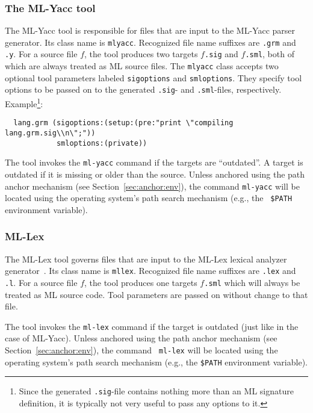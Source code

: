 \documentclass[titlepage,letterpaper]{article}
\begin{document}
\subsubsection*{The ML-Yacc tool}

The ML-Yacc tool is responsible for files that are input to the
ML-Yacc parser generator.  Its class name is {\tt mlyacc}.  Recognized
file name suffixes are {\tt .grm} and {\tt .y}.  For a source file
$f$, the tool produces two targets $f${\tt .sig} and $f${\tt .sml},
both of which are always treated as ML source files.  The {\tt mlyacc}
class accepts two optional tool parameters labeled {\tt sigoptions}
and {\tt smloptions}.  They specify tool options to be passed on to
the generated {\tt .sig}- and {\tt .sml}-files, respectively.
Example\footnote{Since the generated {\tt .sig}-file contains nothing
more than an ML signature definition, it is typically not very useful
to pass any options to it.}:

\begin{verbatim}
  lang.grm (sigoptions:(setup:(pre:"print \"compiling lang.grm.sig\\n\";"))
            smloptions:(private))
\end{verbatim}

The tool invokes the {\tt ml-yacc} command if the targets are
``outdated''.  A target is outdated if it is missing or older than the
source.  Unless anchored using the path anchor mechanism (see
Section~\ref{sec:anchor:env}), the command {\tt ml-yacc} will be located
using the operating system's path search mechanism (e.g., the {\tt
\$PATH} environment variable).

\subsubsection*{ML-Lex}

The ML-Lex tool governs files that are input to the ML-Lex lexical
analyzer generator~\cite{appel89:lex}.  Its class name is {\tt mllex}.
Recognized file name suffixes are {\tt .lex} and {\tt .l}.  For a
source file $f$, the tool produces one targets $f${\tt .sml} which
will always be treated as ML source code.  Tool parameters are passed
on without change to that file.

The tool invokes the {\tt ml-lex} command if the target is outdated
(just like in the case of ML-Yacc).  Unless anchored using the path
anchor mechanism (see Section~\ref{sec:anchor:env}), the command {\tt
ml-lex} will be located using the operating system's path search
mechanism (e.g., the {\tt \$PATH} environment variable).
\end{document}

